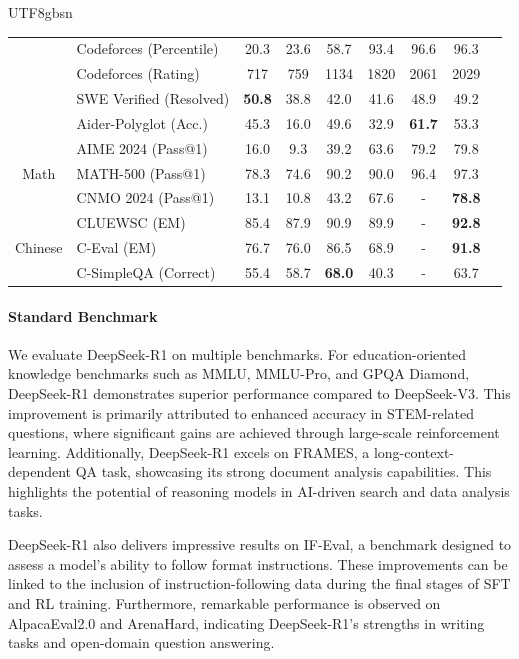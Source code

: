 \documentclass[11pt, a4paper, logo, copyright, nonumbering]{deepseek}
\newcommand{\dsri}{DeepSeek-R1}
\begin{document}
\begin{CJK*}{UTF8}{gbsn}
\begin{table}[h]
\begin{tabular}{@{}c l | c  c  c | c c |c c @{}}
    & Codeforces {\tiny (Percentile)}& 20.3 & 23.6 & 58.7 & 93.4 & 96.6 & 96.3 \\
    & Codeforces {\tiny (Rating)}& 717 & 759 & 1134 & 1820 & 2061 & 2029  \\
    & SWE Verified {\tiny (Resolved)} & \textbf{50.8}&38.8&42.0 & 41.6 & 48.9 & 49.2 \\
    & Aider-Polyglot {\tiny (Acc.)} & 45.3&16.0& 49.6 & 32.9 & \textbf{61.7}&53.3 \\
    \midrule
    \multirow{3}{*}{Math} & AIME 2024 {\tiny (Pass@1)}  & 16.0 & 9.3 & 39.2 & 63.6 & 79.2 & 79.8  \\
    & MATH-500 {\tiny (Pass@1)} &78.3 & 74.6&90.2 & 90.0 & 96.4 & 97.3 \\
    & CNMO 2024 {\tiny (Pass@1)} & 13.1 & 10.8 &43.2 & 67.6 & - & \textbf{78.8} \\
    \midrule
    \multirow{3}{*}{Chinese} & CLUEWSC {\tiny (EM)}&  85.4 & 87.9 & 90.9 & 89.9 & -  &\textbf{92.8} \\
    & C-Eval {\tiny (EM)} & 76.7 & 76.0 & 86.5 & 68.9 & - & \textbf{91.8} \\
     & C-SimpleQA {\tiny (Correct)}  & 55.4 & 58.7 & \textbf{68.0} & 40.3 & -& 63.7 \\
    \bottomrule
    \end{tabular}
    
    \label{tab:main}
\end{table}

\paragraph{Standard Benchmark} \label{sec: benchmark}
We evaluate \dsri{} on multiple benchmarks. 
For education-oriented knowledge benchmarks such as MMLU, MMLU-Pro, and GPQA Diamond, \dsri{} demonstrates superior performance compared to DeepSeek-V3. This improvement is primarily attributed to enhanced accuracy in STEM-related questions, where significant gains are achieved through large-scale reinforcement learning. Additionally, \dsri{} excels on FRAMES, a long-context-dependent QA task, showcasing its strong document analysis capabilities. This highlights the potential of reasoning models in AI-driven search and data analysis tasks. 

\dsri{} also delivers impressive results on IF-Eval, a benchmark designed to assess a model's ability to follow format instructions. These improvements can be linked to the inclusion of instruction-following data during the final stages of SFT and RL training. Furthermore, remarkable performance is observed on AlpacaEval2.0 and ArenaHard, indicating \dsri{}’s strengths in writing tasks and open-domain question answering.


\end{CJK*}
\end{document}
